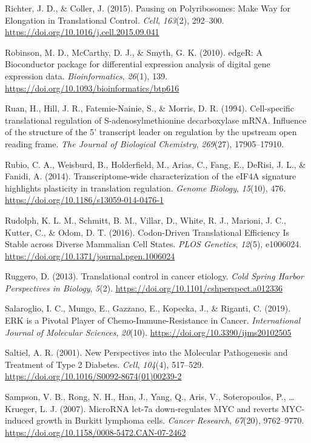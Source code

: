 \documentclass[12pt,openany]{book}
\begin{document}
\hypertarget{ref-Richter2015}{}
Richter, J. D., \& Coller, J. (2015). Pausing on Polyribosomes: Make Way
for Elongation in Translational Control. \emph{Cell}, \emph{163}(2),
292--300. \url{https://doi.org/10.1016/j.cell.2015.09.041}

\hypertarget{ref-Robinson2010}{}
Robinson, M. D., McCarthy, D. J., \& Smyth, G. K. (2010). edgeR: A
Bioconductor package for differential expression analysis of digital
gene expression data. \emph{Bioinformatics}, \emph{26}(1), 139.
\url{https://doi.org/10.1093/bioinformatics/btp616}

\hypertarget{ref-Ruan1994}{}
Ruan, H., Hill, J. R., Fatemie-Nainie, S., \& Morris, D. R. (1994).
Cell-specific translational regulation of S-adenosylmethionine
decarboxylase mRNA. Influence of the structure of the 5' transcript
leader on regulation by the upstream open reading frame. \emph{The
Journal of Biological Chemistry}, \emph{269}(27), 17905--17910.

\hypertarget{ref-Rubio2014}{}
Rubio, C. A., Weisburd, B., Holderfield, M., Arias, C., Fang, E.,
DeRisi, J. L., \& Fanidi, A. (2014). Transcriptome-wide characterization
of the eIF4A signature highlights plasticity in translation regulation.
\emph{Genome Biology}, \emph{15}(10), 476.
\url{https://doi.org/10.1186/s13059-014-0476-1}

\hypertarget{ref-Rudolph2016}{}
Rudolph, K. L. M., Schmitt, B. M., Villar, D., White, R. J., Marioni, J.
C., Kutter, C., \& Odom, D. T. (2016). Codon-Driven Translational
Efficiency Is Stable across Diverse Mammalian Cell States. \emph{PLOS
Genetics}, \emph{12}(5), e1006024.
\url{https://doi.org/10.1371/journal.pgen.1006024}

\hypertarget{ref-Ruggero2013}{}
Ruggero, D. (2013). Translational control in cancer etiology. \emph{Cold
Spring Harbor Perspectives in Biology}, \emph{5}(2).
\url{https://doi.org/10.1101/cshperspect.a012336}

\hypertarget{ref-Salaroglio2019}{}
Salaroglio, I. C., Mungo, E., Gazzano, E., Kopecka, J., \& Riganti, C.
(2019). ERK is a Pivotal Player of Chemo-Immune-Resistance in Cancer.
\emph{International Journal of Molecular Sciences}, \emph{20}(10).
\url{https://doi.org/10.3390/ijms20102505}

\hypertarget{ref-Saltiel2001}{}
Saltiel, A. R. (2001). New Perspectives into the Molecular Pathogenesis
and Treatment of Type 2 Diabetes. \emph{Cell}, \emph{104}(4), 517--529.
\url{https://doi.org/10.1016/S0092-8674(01)00239-2}

\hypertarget{ref-Sampson2007}{}
Sampson, V. B., Rong, N. H., Han, J., Yang, Q., Aris, V., Soteropoulos,
P., \ldots{} Krueger, L. J. (2007). MicroRNA let-7a down-regulates MYC
and reverts MYC-induced growth in Burkitt lymphoma cells. \emph{Cancer
Research}, \emph{67}(20), 9762--9770.
\url{https://doi.org/10.1158/0008-5472.CAN-07-2462}
\end{document}
